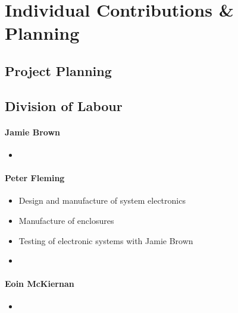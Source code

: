 \documentclass[main.tex]{subfiles}
\begin{document}
\chapter{Individual Contributions \& Planning}
\section{Project Planning}
\section{Division of Labour}

\subsubsection{Jamie Brown}
\begin{itemize}
    \item 
\end{itemize}

\subsubsection{Peter Fleming}
\begin{itemize}
    \item Design and manufacture of system electronics
    \item Manufacture of enclosures
    \item Testing of electronic systems with Jamie Brown
    \item 
\end{itemize}

\subsubsection{Eoin McKiernan}
\begin{itemize}
    \item 
\end{itemize}
\end{document}
